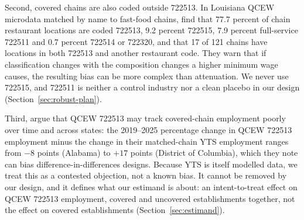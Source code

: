 Second, covered chains are also coded outside 722513. In Louisiana QCEW microdata matched by
name to fast-food chains, \citet{melo2026covered} find that 77.7 percent of chain restaurant
locations are coded 722513, 9.2 percent 722515, 7.9 percent full-service 722511 and 0.7 percent
722514 or 722320, and that 17 of 121 chains have locations in both 722513 and another restaurant
code. They warn that if classification changes with the composition changes a higher minimum
wage causes, the resulting bias can be more complex than attenuation. We never use 722515, and
722511 is neither a control industry nor a clean placebo in our design
(Section~\ref{sec:robust-plan}).

Third, \citet{melo2026covered} argue that QCEW 722513 may track covered-chain employment poorly
over time and across states: the 2019--2025 percentage change in QCEW 722513 employment minus the
change in their matched-chain YTS employment ranges from $-8$ points (Alabama) to $+17$ points
(District of Columbia), which they note can bias difference-in-differences designs. Because YTS
is itself modelled data, we treat this as a contested objection, not a known bias. It cannot be
removed by our design, and it defines what our estimand is about: an intent-to-treat effect on
QCEW 722513 employment, covered and uncovered establishments together, not the effect on covered
establishments (Section~\ref{sec:estimand}).
